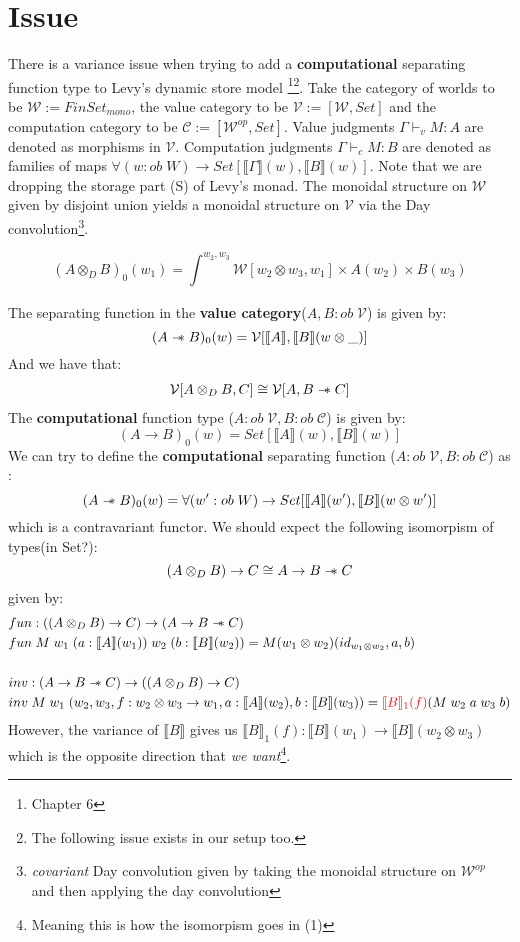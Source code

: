 \documentclass{article}
\newcommand{\den}[1]{\llbracket #1 \rrbracket}
\newcommand{\sep}{\mathrel{-\mkern-6mu*}}
\newcommand{\red}[1]{\textcolor{red}{#1}}
\begin{document}
\section{Issue}
There is a variance issue when trying to add a \textbf{computational} separating 
function type to Levy's dynamic store model\cite{CBPVbook}
\footnote{Chapter 6}\footnote{The following issue exists in our setup too.}. Take the category 
of worlds to be $\mathcal{W} := FinSet_{mono}$, the value category to be $\mathcal{V} :=  [\mathcal{W}, Set]$ 
and the computation category to be $\mathcal{C} := [\mathcal{W}^{op} , Set]$. 
Value judgments $\Gamma \vdash_v M : A$ are denoted as morphisms in $\mathcal{V}$.
Computation judgments $\Gamma \vdash_c M : B$ are denoted as families of maps $\forall(w : ob \;W) 
\rightarrow Set[ \den{\Gamma}(w) , \den{B}(w)]$. Note that we are dropping the storage
part (S) of Levy's monad. The monoidal structure on $\mathcal{W}$ given by disjoint union yields a monoidal
structure on $\mathcal{V}$ via the Day convolution\footnote{\textit{covariant}
Day convolution given by taking the monoidal structure on $\mathcal{W}^{op}$ and
then applying the day convolution}. 

\[
    (A \otimes_D B)_0(w_1) = \int_{}^{w_2,w_3} \mathcal{W}[ w_2 \otimes w_3 , w_1 ] 
    \times A(w_2) \times B(w_3)
\]

The separating function in the \textbf{value category}($A , B : ob \;\mathcal{V}$) is given by:
\[
    (A \sep B)_0(w) = \mathcal{V}[ \den{A} , \den{B}(w \otimes \_)]
\]
And we have that:
\begin{align}
    \mathcal{V} [ A \otimes_D B , C] \cong \mathcal{V} [ A , B \sep C]
\end{align}
The \textbf{computational} function type ($A : ob \;\mathcal{V} , B : ob \;\mathcal{C}$) is given by:
\[ 
    (A \rightarrow B)_0(w) = Set[ \den{A}(w) , \den{B}(w)]
\]
We can try to define the \textbf{computational} separating function ($A : ob \;\mathcal{V} , B : ob \;\mathcal{C}$) as :
\[
    (A \sep B)_0(w) = \forall(w' : ob \; W) \rightarrow Set[ \den{A}(w'), \den{B}(w \otimes w')] 
\]
which is a contravariant functor. We should expect the following isomorpism of types(in Set?):
\[
    (A \otimes_D B) \rightarrow C \cong A \rightarrow B \sep C  
\]
given by:
\begin{align*}
    &fun : ((A \otimes_D B) \rightarrow C) \rightarrow (A \rightarrow B \sep C )\\
    &fun \; M \; w_1 \;(a : \den{A}(w_1)) \; w_2 \;(b : \den{B}(w_2)) = M (w_1 \otimes w_2)(id_{w_1 \otimes w_2} , a , b)\\
    \\
    &inv :(A \rightarrow B \sep C ) \rightarrow ((A \otimes_D B) \rightarrow C)\\
    &inv \; M \; w_1 \; (w_2,w_3,f : w_2 \otimes w_3 \rightarrow w_1, a : \den{A}(w_2), b : \den{B}(w_3)) = \red{\den{B}_1(f)}(M \; w_2 \; a \; w_3 \; b)
\end{align*}
However, the variance of $\den{B}$ gives us $\den{B}_1(f) : \den{B}(w_1) \rightarrow \den{B}(w_2 \otimes w_3)$ 
which is the opposite direction that \textit{we want}\footnote{Meaning this is how the isomorpism goes in (1)}.
\end{document}
